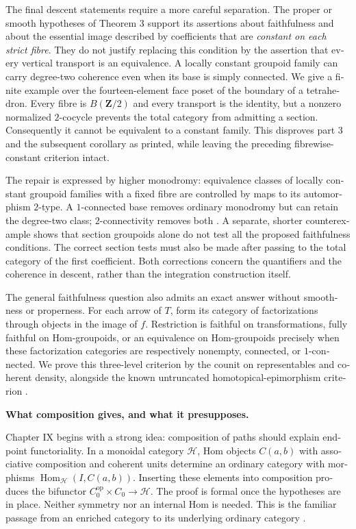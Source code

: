 \begin{otherlanguage}{english}
The final descent statements require a more careful separation. The proper or smooth hypotheses of Theorem 3 support its assertions about faithfulness and about the essential image described by coefficients that are \emph{constant on each strict fibre}. They do not justify replacing this condition by the assertion that every vertical transport is an equivalence. A locally constant groupoid family can carry degree-two coherence even when its base is simply connected. We give a finite example over the fourteen-element face poset of the boundary of a tetrahedron. Every fibre is $B(\mathbf Z/2)$ and every transport is the identity, but a nonzero normalized $2$-cocycle prevents the total category from admitting a section. Consequently it cannot be equivalent to a constant family. This disproves part 3 and the subsequent corollary as printed, while leaving the preceding fibrewise-constant criterion intact.

The repair is expressed by higher monodromy: equivalence classes of locally constant groupoid families with a fixed fibre are controlled by maps to its automorphism $2$-type. A $1$-connected base removes ordinary monodromy but can retain the degree-two class; $2$-connectivity removes both \citep[Corollary~2.2.4 and Theorem~2.2.5, arXiv version]{PoleselloWaschkies2005}. A separate, shorter counterexample shows that section groupoids alone do not test all the proposed faithfulness conditions. The correct section tests must also be made after passing to the total category of the first coefficient. Both corrections concern the quantifiers and the coherence in descent, rather than the integration construction itself.

The general faithfulness question also admits an exact answer without smoothness or properness. For each arrow of $T$, form its category of factorizations through objects in the image of $f$. Restriction is faithful on transformations, fully faithful on Hom-groupoids, or an equivalence on Hom-groupoids precisely when these factorization categories are respectively nonempty, connected, or $1$-connected. We prove this three-level criterion by the counit on representables and coherent density, alongside the known untruncated homotopical-epimorphism criterion \citep[Theorem~6.10, arXiv version]{GrothStovicek2016Trees}.

\medskip\noindent\textbf{What composition gives, and what it presupposes.}

Chapter IX begins with a strong idea: composition of paths should explain endpoint functoriality. In a monoidal category $\mathcal H$, Hom objects $C(a,b)$ with associative composition and coherent units determine an ordinary category with morphisms $\operatorname{Hom}_{\mathcal H}(I,C(a,b))$. Inserting these elements into composition produces the bifunctor $C_0^{\mathrm{op}}\times C_0\to\mathcal H$. The proof is formal once the hypotheses are in place. Neither symmetry nor an internal Hom is needed. This is the familiar passage from an enriched category to its underlying ordinary category \citep[\S\S1.1--1.3]{Kelly1982}.


\end{otherlanguage}
